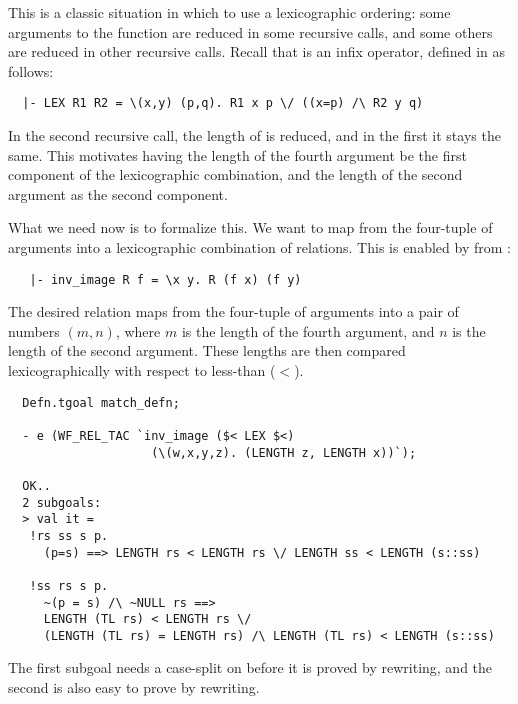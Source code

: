 This is a classic situation in which to use a lexicographic ordering:
some arguments to the function are reduced in some recursive calls, and
some others are reduced in other recursive calls.  Recall that  is
an infix operator, defined in  as follows:
%
\begin{hol}
\begin{verbatim}
  |- LEX R1 R2 = \(x,y) (p,q). R1 x p \/ ((x=p) /\ R2 y q)
\end{verbatim}
\end{hol}
%
In the second recursive call, the length of  is reduced, and in
the first it stays the same. This motivates having the length of the
fourth argument be the first component of the lexicographic
combination, and the length of the second argument as the second
component.

What we need now is to formalize this. We want to map from the
four-tuple of arguments into a lexicographic combination of
relations. This is enabled by  from :
%
\begin{hol}
\begin{verbatim}
   |- inv_image R f = \x y. R (f x) (f y)
\end{verbatim}
\end{hol}
%
The desired relation maps from the four-tuple of arguments into a pair
of numbers $(m,n)$, where $m$ is the length of the fourth argument, and
$n$ is the length of the second argument. These lengths are then
compared lexicographically with respect to less-than ($<$).
\begin{session}
\begin{hol}
\begin{verbatim}
  Defn.tgoal match_defn;

  - e (WF_REL_TAC `inv_image ($< LEX $<)
                    (\(w,x,y,z). (LENGTH z, LENGTH x))`);

  OK..
  2 subgoals:
  > val it =
   !rs ss s p.
     (p=s) ==> LENGTH rs < LENGTH rs \/ LENGTH ss < LENGTH (s::ss)

   !ss rs s p.
     ~(p = s) /\ ~NULL rs ==>
     LENGTH (TL rs) < LENGTH rs \/
     (LENGTH (TL rs) = LENGTH rs) /\ LENGTH (TL rs) < LENGTH (s::ss)
\end{verbatim}
\end{hol}
\end{session}
%
The first subgoal needs a case-split on  before it is proved by
rewriting, and the second is also easy to prove by rewriting.

